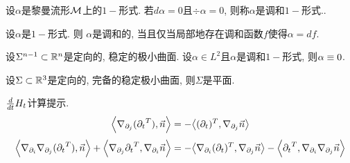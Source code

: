 \ifshow
设$\alpha$是黎曼流形${\mathcal{M}}$上的$1-$形式. 若$d\alpha=0$且$\div \alpha=0$, 则称$\alpha$是调和$1-$形式..
\begin{proposition}
    设$\alpha$是$1-$形式. 则 $\alpha$是调和的, 当且仅当局部地存在调和函数$f$使得$\alpha = df$.
\end{proposition}
\begin{theorem}
    设$\Sigma^{n-1}\subset \mathbb{R}^n$是定向的, 稳定的极小曲面. 设$\alpha\in L^2$且$\alpha$是调和$1-$形式, 则$\alpha \equiv 0$.
\end{theorem}
\begin{theorem}[Bernstein定理]
    设$\Sigma \subset \mathbb{R}^3$是定向的, 完备的稳定极小曲面, 则$\Sigma$是平面.
\end{theorem}
\fi
\ifshow
\begin{remark}
    $\frac{d}{dt} H_t$计算提示. 
    \begin{equation}
        {\left < \nabla_{{\partial_j}}({\partial_t}^T), \vec{n} \right >}=-{\left < ({\partial_t})^T, \nabla_{{\partial_j}}\vec{n} \right >}
    \end{equation}
    \begin{equation}
        {\left < \nabla_{{\partial_i}}\nabla_{{\partial_j}}({\partial_t}^T), \vec{n} \right >}+{\left < \nabla_{{\partial_j}}{\partial_t}^T, \nabla_{{\partial_i}}\vec{n} \right >}=-{\left < \nabla_{{\partial_i}}({\partial_t})^T, \nabla_{{\partial_j}}\vec{n} \right >}-{\left < {\partial_t}^T, \nabla_{{\partial_i}}\nabla_{{\partial_j}}\vec{n} \right >}
    \end{equation}
\end{remark}
\fi

